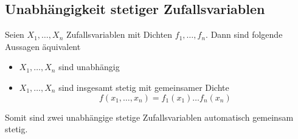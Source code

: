 \subsection{Unabhängigkeit stetiger Zufallsvariablen}
\Theo[5.11] \newline
Seien \(X_1, \dots , X_n \) Zufallsvariablen mit Dichten \(f_1, \dots , f_n\). Dann sind folgende Aussagen äquivalent
\begin{itemize}
    \item \(X_1, \dots , X_n \) sind unabhängig
    \item \(X_1, \dots , X_n \) sind insgesamt stetig mit gemeinsamer Dichte \[f(x_1, \dots , x_n) = f_1(x_1) \dots f_n(x_n)\]
\end{itemize}
\Bem[5.12] \newline
Somit sind zwei unabhängige stetige Zufallsvariablen automatisch gemeinsam stetig.


